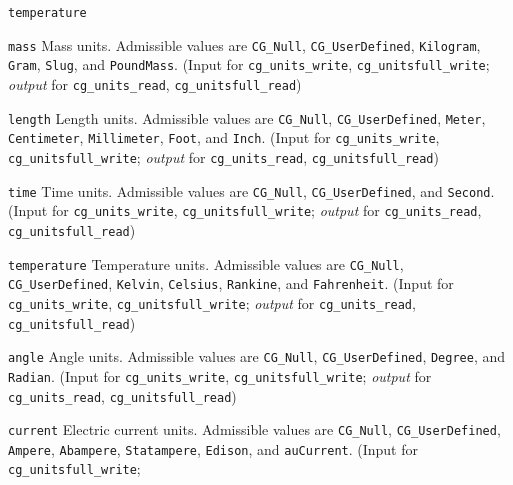 \begin{Ventryi}{\texttt{temperature}}\raggedright
\item [\texttt{mass}]
      Mass units.
      Admissible values are \texttt{CG\_Null}, \texttt{CG\_UserDefined},
      \texttt{Kilogram}, \texttt{Gram}, \texttt{Slug}, and
      \texttt{PoundMass}.
      (\textcolor{input}{Input} for \texttt{cg\_units\_write},
      \texttt{cg\_unitsfull\_write};
      \textcolor{output}{\textit{output}} for \texttt{cg\_units\_read},
      \texttt{cg\_unitsfull\_read})
\item [\texttt{length}]
      Length units.
      Admissible values are \texttt{CG\_Null}, \texttt{CG\_UserDefined},
      \texttt{Meter}, \texttt{Centimeter}, \texttt{Millimeter},
      \texttt{Foot}, and \texttt{Inch}.
      (\textcolor{input}{Input} for \texttt{cg\_units\_write},
      \texttt{cg\_unitsfull\_write};
      \textcolor{output}{\textit{output}} for \texttt{cg\_units\_read},
      \texttt{cg\_unitsfull\_read})
\item [\texttt{time}]
      Time units.
      Admissible values are \texttt{CG\_Null}, \texttt{CG\_UserDefined}, and
      \texttt{Second}.
      (\textcolor{input}{Input} for \texttt{cg\_units\_write},
      \texttt{cg\_unitsfull\_write};
      \textcolor{output}{\textit{output}} for \texttt{cg\_units\_read},
      \texttt{cg\_unitsfull\_read})
\item [\texttt{temperature}]
      Temperature units.
      Admissible values are \texttt{CG\_Null}, \texttt{CG\_UserDefined},
      \texttt{Kelvin}, \texttt{Celsius}, \texttt{Rankine}, and
      \texttt{Fahrenheit}.
      (\textcolor{input}{Input} for \texttt{cg\_units\_write},
      \texttt{cg\_unitsfull\_write};
      \textcolor{output}{\textit{output}} for \texttt{cg\_units\_read},
      \texttt{cg\_unitsfull\_read})
\item [\texttt{angle}]
      Angle units.
      Admissible values are \texttt{CG\_Null}, \texttt{CG\_UserDefined},
      \texttt{Degree}, and \texttt{Radian}.
      (\textcolor{input}{Input} for \texttt{cg\_units\_write},
      \texttt{cg\_unitsfull\_write};
      \textcolor{output}{\textit{output}} for \texttt{cg\_units\_read},
      \texttt{cg\_unitsfull\_read})
\item [\texttt{current}]
      Electric current units.
      Admissible values are \texttt{CG\_Null}, \texttt{CG\_UserDefined},
      \texttt{Ampere}, \texttt{Abampere}, \texttt{Statampere},
      \texttt{Edison}, and \texttt{auCurrent}.
      (\textcolor{input}{Input} for \texttt{cg\_unitsfull\_write};

\end{Ventryi}
